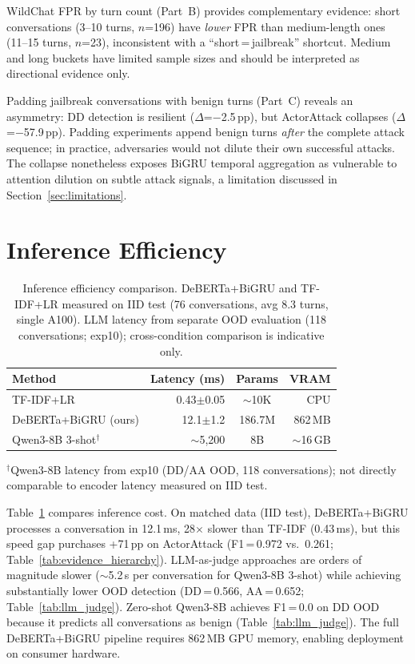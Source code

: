 WildChat FPR by turn count (Part~B) provides complementary evidence: short conversations (3--10 turns, $n$=196) have \emph{lower} FPR than medium-length ones (11--15 turns, $n$=23), inconsistent with a ``short\,=\,jailbreak'' shortcut. Medium and long buckets have limited sample sizes and should be interpreted as directional evidence only.

Padding jailbreak conversations with benign turns (Part~C) reveals an asymmetry: DD detection is resilient ($\Delta$=$-$2.5\,pp), but ActorAttack collapses ($\Delta$=$-$57.9\,pp). Padding experiments append benign turns \emph{after} the complete attack sequence; in practice, adversaries would not dilute their own successful attacks. The collapse nonetheless exposes BiGRU temporal aggregation as vulnerable to attention dilution on subtle attack signals, a limitation discussed in Section~\ref{sec:limitations}.

\section{Inference Efficiency}
\label{app:efficiency}

\begin{table}[ht]
\centering
\footnotesize
\caption{Inference efficiency comparison. DeBERTa+BiGRU and TF-IDF+LR measured on IID test (76 conversations, avg 8.3 turns, single A100). LLM latency from separate OOD evaluation (118 conversations; exp10); cross-condition comparison is indicative only.}
\label{tab:efficiency}
\begin{tabular}{@{}lrcr@{}}
\toprule
\textbf{Method} & Latency (ms) & Params & VRAM \\
\midrule
TF-IDF+LR & 0.43$\pm$0.05 & $\sim$10K & CPU \\
DeBERTa+BiGRU (ours) & 12.1$\pm$1.2 & 186.7M & 862\,MB \\
Qwen3-8B 3-shot$^{\dagger}$ & $\sim$5{,}200 & 8B & $\sim$16\,GB \\
\bottomrule
\end{tabular}
\vspace{-2pt}
{\footnotesize $^{\dagger}$Qwen3-8B latency from exp10 (DD/AA OOD, 118 conversations); not directly comparable to encoder latency measured on IID test.}
\end{table}

Table~\ref{tab:efficiency} compares inference cost. On matched data (IID test), DeBERTa+BiGRU processes a conversation in 12.1\,ms, 28$\times$ slower than TF-IDF (0.43\,ms), but this speed gap purchases +71\,pp on ActorAttack (F1\,=\,0.972 vs.\ 0.261; Table~\ref{tab:evidence_hierarchy}). LLM-as-judge approaches are orders of magnitude slower ($\sim$5.2\,s per conversation for Qwen3-8B 3-shot) while achieving substantially lower OOD detection (DD\,=\,0.566, AA\,=\,0.652; Table~\ref{tab:llm_judge}). Zero-shot Qwen3-8B achieves F1\,=\,0.0 on DD OOD because it predicts all conversations as benign (Table~\ref{tab:llm_judge}). The full DeBERTa+BiGRU pipeline requires 862\,MB GPU memory, enabling deployment on consumer hardware.

